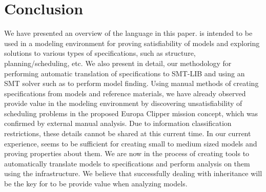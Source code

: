 
\section{Conclusion}
\label{sec:conclusion}

We have presented an overview of the \Klang{} language in this
paper. \Klang{} is intended to be used in a modeling environment for
proving satisfiability of \sysml{} models and exploring solutions to
various types of specifications, such as structure,
planning/scheduling, etc. We also present in detail, our methodology
for performing automatic translation of \Klang{} specifications to
SMT-LIB and using an SMT solver such as \zthree{} to perform model
finding. Using manual methods of creating \Klang{} specifications from
\sysml{} models and reference materials, we have already observed
\Klang{} provide value in the modeling environment by discovering
unsatisfiability of scheduling problems in the proposed Europa Clipper
mission concept, which was confirmed by external manual analysis. Due
to information classification restrictions, these details cannot be
shared at this current time. In our current experience, \Klang{} seems
to be sufficient for creating small to medium sized \sysml{} models
and proving properties about them. We are now in the process of
creating tools to automatically translate \sysml{} models to \Klang{}
specifications and perform analysis on them using the \Klang{}
infrastructure. We believe that successfully dealing with inheritance
will be the key for \Klang{} to be provide value when analyzing
\sysml{} models.

